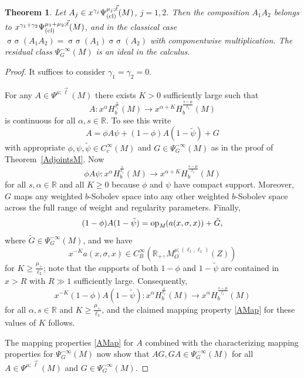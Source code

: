 \documentclass[reqno]{amsart}
\numberwithin{equation}{section}
\newtheorem{theorem}[equation]{Theorem}
\theoremstyle{definition}
\def\R{\mathbb R}
\def\opm{\textup{op}_{\textit{M}}}
\DeclareMathOperator{\sym}{ \sigma\!\!\!\sigma}
\begin{document}
\begin{theorem}\label{CompositionM}
Let $A_j \in x^{\gamma_j} \Psi^{\mu_j;\vec{\ell}}_{\textup{(cl)}}(M)$, $j = 1,2$. Then the composition $A_1A_2$ belongs to $x^{\gamma_1+\gamma_2} \Psi^{\mu_1+\mu_2;\vec{\ell}}_{\textup{(cl)}}(M)$, and in the classical case $\sym(A_1A_2) = \sym(A_1)\sym(A_2)$ with componentwise multiplication. The residual class $\Psi^{-\infty}_G(M)$ is an ideal in the calculus.
\end{theorem}
\begin{proof}
It suffices to consider $\gamma_1=\gamma_2=0$.

For any $A \in \Psi^{\mu;\vec{\ell}}(M)$ there exists $K > 0$ sufficiently large such that
\begin{equation}\label{AMap}
A : x^{\alpha}H^{\frac{s}{\ell_1}}_b(M) \to x^{\alpha+K}H^{\frac{s-\mu}{\ell_1}}_b(M)
\end{equation}
is continuous for all $\alpha, s \in \R$. To see this write
$$
A = \phi A \psi + (1-\phi)A(1-\tilde{\psi}) + G
$$
with appropriate $\phi,\psi,\tilde{\psi} \in C_c^{\infty}(M)$ and $G \in \Psi^{-\infty}_G(M)$ as in the proof of Theorem~\ref{AdjointsM}. Now
$$
\phi A \psi : x^{\alpha}H^{\frac{s}{\ell_1}}_b(M) \to x^{\alpha+K}H^{\frac{s-\mu}{\ell_1}}_b(M)
$$
for all $s,\alpha \in \R$ and all $K \geq 0$ because $\phi$ and $\psi$ have compact support. Moreover, $G$ maps any weighted $b$-Sobolev space into any other weighted $b$-Sobolev space across the full range of weight and regularity parameters. Finally,
$$
(1-\phi)A(1-\tilde{\psi}) = \opm(a(x,\sigma,x)) + \tilde{G},
$$
where $\tilde{G} \in \Psi^{-\infty}_G(M)$, and we have
$$
x^{-K} a(x,\sigma,x) \in C^{\infty}_B(\R_+,M^{\mu;(\ell_1,\ell_1)}_O(Z))
$$
for $K \geq \frac{\mu_+}{\ell_3}$; note that the supports of both $1-\phi$ and $1-\tilde{\psi}$ are contained in $x > R$ with $R \gg 1$ sufficiently large. Consequently,
$$
x^{-K} (1-\phi)A(1-\tilde{\psi}) : x^{\alpha}H^{\frac{s}{\ell_1}}_b(M) \to x^{\alpha}H^{\frac{s-\mu}{\ell_1}}_b(M)
$$
for all $\alpha,s \in \R$ and $K \geq \frac{\mu_+}{\ell_3}$, and the claimed mapping property \eqref{AMap} for these values of $K$ follows.

The mapping properties \eqref{AMap} for $A$ combined with the characterizing mapping properties for $\Psi^{-\infty}_G(M)$ now show that $AG, GA \in \Psi^{-\infty}_G(M)$ for all $A \in \Psi^{\mu;\vec{\ell}}(M)$ and $G \in \Psi^{-\infty}_G(M)$.


\end{proof}
\end{document}
